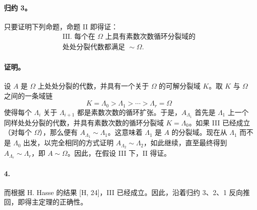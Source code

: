 \paragraph{归约 3。}
只要证明下列命题，命题 II 即得证：
\[
\begin{gathered}\text{III. 每个在 }\Omega\text{ 上具有素数次数循环分裂域的}\\\text{处处分裂代数都满足 }\sim\Omega .\end{gathered}
\]

\paragraph{证明。}
设 \(A\) 是 \(\Omega\) 上处处分裂的代数，并具有一个关于 \(\Omega\) 的可解分裂域 \(K\)。取 \(K\) 与 \(\Omega\) 之间的一条域链
\[
K=\Lambda_0>\Lambda_1>\cdots>\Lambda_r=\Omega
\]
使得每个 \(\Lambda_i\) 关于 \(\Lambda_{i+1}\) 都是素数次数的循环扩张。于是，\(A_{\Lambda_1}\) 首先是 \(\Lambda_1\) 上一个同样处处分裂的代数，并具有素数次数的循环分裂域 \(K=\Lambda_0\)。如果 III 已经成立（对每个 \(\Omega\)），那么便有 \(A_{\Lambda_1}\sim \Lambda_1\)。这意味着 \(\Lambda_1\) 是 \(A\) 的分裂域。现在从 \(\Lambda_1\) 而不是 \(\Lambda_0\) 出发，以完全相同的方式证明 \(A_{\Lambda_2}\sim\Lambda_2\)，如此继续，直至最终得到 \(A_{\Lambda_r}\sim\Lambda_r\)，即 \(A\sim\Omega\)。因此，在假设 III 下，II 得证。

\paragraph{4.}
而根据 H. Hasse 的结果 [H, 24]，III 已经成立。因此，沿着归约 3、2、1 反向推回，即得主定理的正确性。
